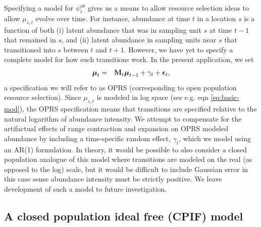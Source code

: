 \documentclass[times,mee,doublespace,]{besauth2}
\begin{document}
Specifying a model for $\psi^{ab}_t$ gives us a means to allow resource selection ideas to allow $\mu_{s,t}$ evolve over time.  For instance, abundance at time $t$ in a location $s$ is a function of both (i) latent abundance that was in sampling unit $s$ at time $t-1$ that remained in $s$, and (ii) latent abundance in sampling units near $s$ that transitioned into $s$ between $t$ and $t+1$.  However, we have yet to specify a complete model for how such transitions work.  In the present application, we set
\begin{eqnarray*}
  \boldsymbol{\mu}_t & = & {\bf M}_t \boldsymbol{\mu}_{t-1} + \gamma_t + \boldsymbol{\epsilon}_t, %
\end{eqnarray*}
a specification we will refer to as OPRS (corresponding to open population resource selection). Since $\mu_{s,t}$ is modeled in log space (see e.g. eqn \ref{eq:basic-mod}), the OPRS specification means that transitions are specified relative to the natural logarithm of abundance intensity. We attempt to compensate for the artifactual effects of range contraction and expansion on OPRS modeled abundance by including a time-specific random effect, $\gamma_t$, which we model using an AR(1) formulation.  In theory, it would be possible to also consider a closed population analogue of this model where transitions are modeled on the real (as opposed to the log) scale, but it would be difficult to include Gaussian error in this case sense abundance intensity must be strictly positive.  We leave development of such a model to future investigation.


\subsection{A closed population ideal free (CPIF) model}
\end{document}

